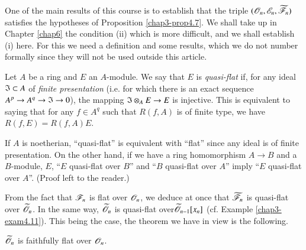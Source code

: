 One of the main results of this course is to establish that the triple $(\mathscr{O}_{n},\mathscr{E}_{n},\widetilde{\mathscr{F}}_{n})$ satisfies the hypotheses of Proposition \ref{chap3-prop4.7}. We shall take up in Chapter \ref{chap6} the condition (ii) which is more difficult, and we shall establish (i) here. For this we need a definition and some results, which we do not number formally since they will not be used outside this article.

Let $A$ be a ring and $E$ an $A$-module. We say that $E$ is {\em quasi-flat} if, for any ideal $\mathfrak{I}\subset A$ of {\em finite presentation} (i.e. for which there is an exact sequence $A^{p}\to A^{q}\to \mathfrak{I}\to 0$), the mapping $\mathfrak{I}\otimes_{A}E\to E$ is injective. This is equivalent to saying that for any $f\in A^{q}$ such that $R(f,A)$ is of finite type, we have $R(f,E)=R(f,A)E$.

If $A$ is noetherian, ``quasi-flat'' is equivalent with ``flat'' since any ideal is of finite presentation. On the other hand, if we have a ring homomorphism $A\to B$ and a $B$-module, $E$, ``$E$ quasi-flat over $B$'' and ``$B$ quasi-flat over $A$'' imply ``$E$ quasi-flat over $A$''. (Proof left to the reader.)

\begin{examples*}
From the fact that $\mathscr{F}_{n}$ is flat over $\mathscr{O}_{n}$, we deduce at once that $\widetilde{\mathscr{F}}_{n}$ is quasi-flat over $\widetilde{\mathscr{O}}_{n}$. In the same way, $\widetilde{\mathscr{O}}_{n}$ is quasi-flat over\pageoriginale $\widetilde{\mathscr{O}}_{n-1}[x_{n}]$ (cf. Example \ref{chap3-exam4.11}). This being the case, the theorem we have in view is the following.
\end{examples*}

\begin{theorem}[Oka]\label{chap3-thm4.12}
$\widetilde{\mathscr{O}}_{n}$ is faithfully flat over $\mathscr{O}_{n}$.
\end{theorem}

